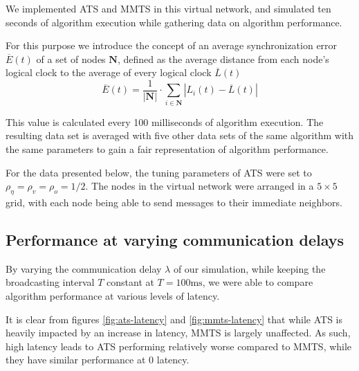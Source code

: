 \documentclass[a4paper,12pt]{article}
\begin{document}
We implemented ATS and MMTS in this virtual network, and simulated ten seconds of algorithm execution while gathering data on algorithm performance.

For this purpose we introduce the concept of an average synchronization error $\overline{E}(t)$ of a set of nodes $\boldsymbol{N}$, defined as the average distance from each node's logical clock to the average of every logical clock $\overline{L}(t)$ $$\overline{E}(t) = \frac{1}{|\boldsymbol{N}|} \cdot \sum_{i \in \boldsymbol{N}} \left| L_i(t) - \overline{L}(t) \right|$$

This value is calculated every 100 milliseconds of algorithm execution. The resulting data set is averaged with five other data sets of the same algorithm with the same parameters to gain a fair representation of algorithm performance.

For the data presented below, the tuning parameters of ATS were set to $\rho_\eta = \rho_v = \rho_o = 1 / 2$. The nodes in the virtual network were arranged in a $5\times5$ grid, with each node being able to send messages to their immediate neighbors.

\subsection{Performance at varying communication delays}
By varying the communication delay $\lambda$ of our simulation, while keeping the broadcasting interval $T$ constant at $T = 100 \text{ms}$, we were able to compare algorithm performance at various levels of latency.

It is clear from figures \ref{fig:ats-latency} and \ref{fig:mmts-latency} that while ATS is heavily impacted by an increase in latency, MMTS is largely unaffected. As such, high latency leads to ATS performing relatively worse compared to MMTS, while they have similar performance at $0$ latency.
\end{document}
